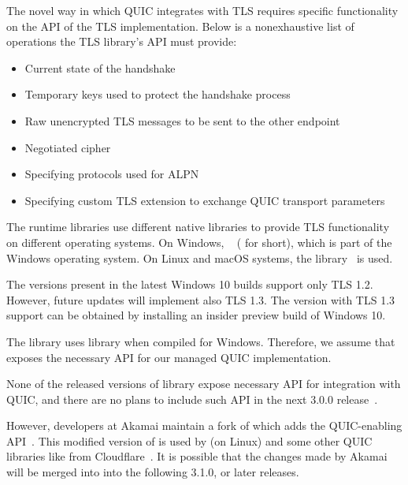 The novel way in which QUIC integrates with TLS requires specific functionality on the API of the
TLS implementation. Below is a nonexhaustive list of operations the TLS library's API must provide:

\begin{itemize}

  \item Current state of the handshake

  \item Temporary keys used to protect the handshake process

  \item Raw unencrypted TLS messages to be sent to the other endpoint

  \item Negotiated cipher

  \item Specifying protocols used for ALPN

  \item Specifying custom TLS extension to exchange QUIC transport parameters

\end{itemize}

The \dotnet{} runtime libraries use different native libraries to provide TLS functionality on
different operating systems. On Windows, ~\cite{Schannel} (\libschannel{}
for short), which is part of the Windows operating system. On Linux and macOS systems, the
\libopenssl{} library~\cite{OpenSSLWeb} is used.

\begin{description}

    The \libschannel{} versions present in the latest Windows 10
    builds support only TLS 1.2.  However, future updates will implement also TLS 1.3. The
    \libschannel{} version with TLS 1.3 support can be obtained by installing an insider preview
    build of Windows 10.

    The \libmsquic{} library uses \libschannel{} library when compiled for Windows. Therefore, we
    assume that \libschannel{} exposes the necessary API for our managed QUIC implementation.

    \ditem{\libopenssl{}}
    None of the released versions of \libopenssl{} library expose necessary API for integration
    with QUIC, and there are no plans to include such API in the next \libopenssl{} 3.0.0
    release~\cite{OpensslBlogNoQuic}.

    However, developers at Akamai maintain a fork of \libopenssl{} which adds the QUIC-enabling
    API~\cite{AkamaiOpensslGithub}. This modified version of \libopenssl{} is used by \libmsquic{}
    (on Linux) and some other QUIC libraries like  from
    Cloudflare~\cite{quicheGithub}. It is possible that the changes made by Akamai will be merged
    into \libopenssl{} into the following 3.1.0, or later releases.

\end{description}

